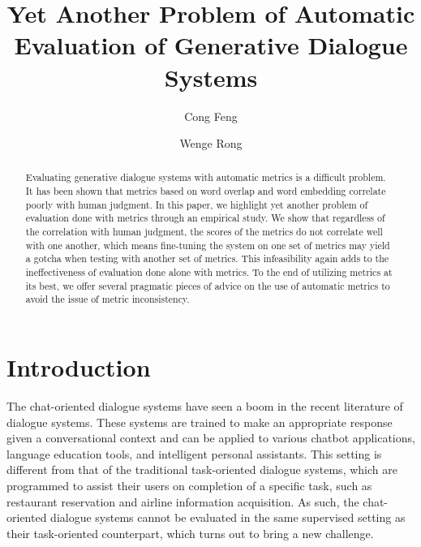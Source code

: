 \documentclass[runningheads]{llncs}
\begin{document}
    \title{Yet Another Problem of Automatic Evaluation of Generative Dialogue Systems}


    \author{Cong Feng \and Wenge Rong}



    \maketitle

    \begin{abstract}
        Evaluating generative dialogue systems with automatic metrics is a difficult problem. It has been shown that metrics based on word overlap and word embedding correlate poorly with human judgment. In this paper, we highlight yet another problem of evaluation done with metrics through an empirical study. We show that regardless of the correlation with human judgment, the scores of the metrics do not correlate well with one another, which means fine-tuning the system on one set of metrics may yield a gotcha when testing with another set of metrics. This infeasibility again adds to the ineffectiveness of evaluation done alone with metrics. To the end of utilizing metrics at its best, we offer several pragmatic pieces of advice on the use of automatic metrics to avoid the issue of metric inconsistency.
    \end{abstract}


    \section{Introduction}
    The chat-oriented dialogue systems have seen a boom in the recent literature of dialogue systems. These systems are trained to make an appropriate response given a conversational context and can be applied to various chatbot applications, language education tools, and intelligent personal assistants. This setting is different from that of the traditional task-oriented dialogue systems, which are programmed to assist their users on completion of a specific task, such as restaurant reservation and airline information acquisition. As such, the chat-oriented dialogue systems cannot be evaluated in the same supervised setting as their task-oriented counterpart, which turns out to bring a new challenge.
\end{document}
